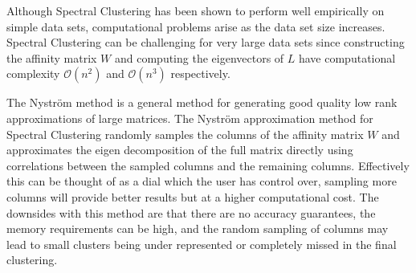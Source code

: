 Although Spectral Clustering has been shown to perform well empirically on simple data sets, computational problems arise as the data set size increases.  Spectral Clustering can be challenging for very large data sets since constructing the affinity matrix $W$ and computing the eigenvectors of $L$ have computational complexity $\mathcal{O}(n^2)$ and $\mathcal{O}(n^3)$ respectively. 

The Nystr\"{o}m method \citep{Williams2001} is a general method for generating good quality low rank approximations of large matrices. The Nystr\"{o}m approximation method for Spectral Clustering \citep{Fowlkes2004} randomly samples the columns of the affinity matrix $W$ and approximates the eigen decomposition of the full matrix directly using correlations between the sampled columns and the remaining columns. Effectively this can be thought of as a dial which the user has control over, sampling more columns will provide better results but at a higher computational cost. The downsides with this method are that there are no accuracy guarantees, the  memory requirements can be high, and the random sampling of columns may lead to small clusters being under represented or completely missed in the final clustering. 



